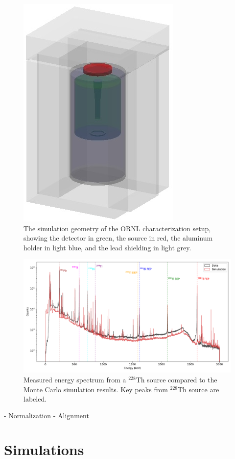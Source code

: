 \begin{figure}%
    \centering
    \includegraphics[width=0.4\linewidth]{ch7/figs/shielding.jpeg}
    \caption{The simulation geometry of the ORNL characterization setup, showing the detector in green, the source in red, the aluminum holder in light blue, and the lead shielding in light grey.}
   \label{fig:g4simple_setup}
\end{figure}


\begin{figure}%
\centering
    \includegraphics[width=0.99\linewidth,trim={0pc 0pc 0pc 0pc},clip]{ch7/figs/energy_spectrum_comparison.pdf}
    \caption{Measured energy spectrum from a $^{228}$Th source compared to the Monte Carlo simulation results. Key peaks from $^{228}$Th source are labeled.}
   \label{fig:eng_spec}
\end{figure}



- Normalization
- Alignment

\section{Simulations}


